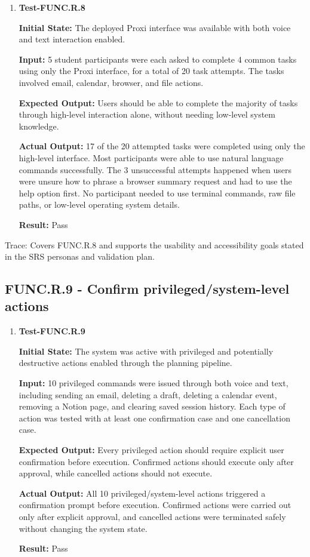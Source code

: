 \documentclass[12pt]{article}
\begin{document}
\begin{enumerate}
    \item \textbf{Test-FUNC.R.8}
    
    \textbf{Initial State:} The deployed Proxi interface was available
    with both voice and text interaction enabled.
    
    \textbf{Input:} 5 student participants were each asked to complete
    4 common tasks using only the Proxi interface, for a total of 20
    task attempts. The tasks involved email, calendar, browser, and
    file actions.
    
    \textbf{Expected Output:} Users should be able to complete the
    majority of tasks through high-level interaction alone, without
    needing low-level system knowledge.
    
    \textbf{Actual Output:} 17 of the 20 attempted tasks were
    completed using only the high-level interface. Most participants
    were able to use natural language commands successfully. The 3
    unsuccessful attempts happened when users were unsure how to phrase
    a browser summary request and had to use the help option first. No
    participant needed to use terminal commands, raw file paths, or
    low-level operating system details.
    
    \textbf{Result:} Pass
\end{enumerate}

\noindent Trace: Covers FUNC.R.8 and supports the usability and accessibility
goals stated in the SRS personas and validation plan.


\subsection{FUNC.R.9 - Confirm privileged/system-level actions}

\begin{enumerate}
    \item \textbf{Test-FUNC.R.9}
    
    \textbf{Initial State:} The system was active with privileged and
    potentially destructive actions enabled through the planning
    pipeline.
    
    \textbf{Input:} 10 privileged commands were issued through both
    voice and text, including sending an email, deleting a draft,
    deleting a calendar event, removing a Notion page, and clearing
    saved session history. Each type of action was tested with at least
    one confirmation case and one cancellation case.
    
    \textbf{Expected Output:} Every privileged action should require
    explicit user confirmation before execution. Confirmed actions
    should execute only after approval, while cancelled actions should
    not execute.
    
    \textbf{Actual Output:} All 10 privileged/system-level actions
    triggered a confirmation prompt before execution. Confirmed actions
    were carried out only after explicit approval, and cancelled
    actions were terminated safely without changing the system state.
    
    \textbf{Result:} Pass
\end{enumerate}
\end{document}
